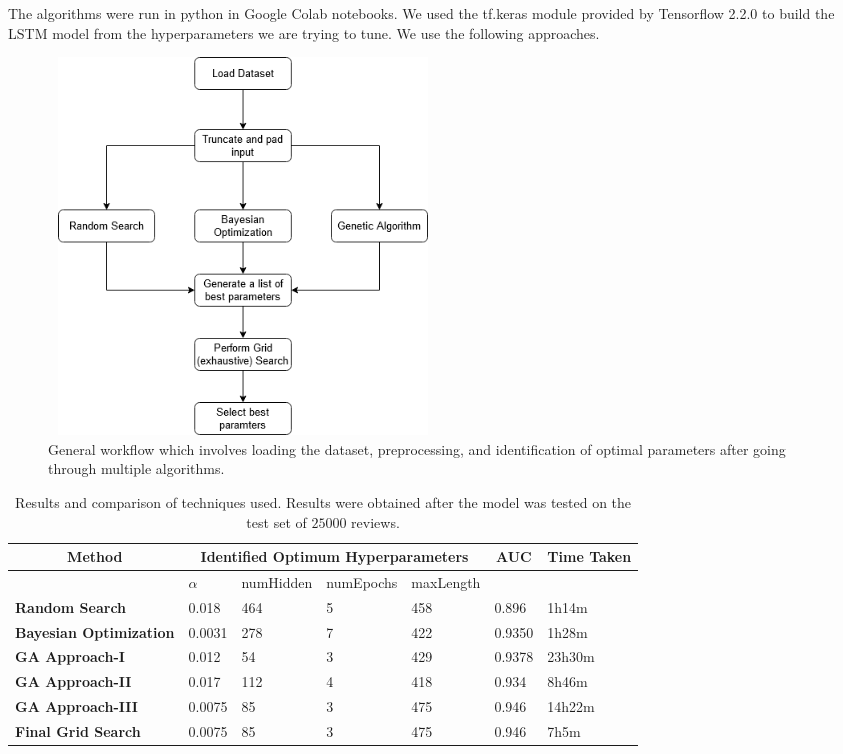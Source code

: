 \documentclass[conference]{IEEEtran}
\begin{document}
The algorithms were run in python in Google Colab notebooks. We used the tf.keras module provided by Tensorflow 2.2.0 to build the LSTM model from the hyperparameters we are trying to tune. We use the following approaches.

\begin{figure}
\includegraphics[width=0.5\textwidth, height=10cm, keepaspectratio]{flowchart.png}
\caption{ General workflow which involves loading the dataset, preprocessing, and identification of optimal parameters after going through multiple algorithms. }
 \label{fig:flowchart}
\end{figure}


\begin{table}[t]
\fontsize{9pt}{11pt}
\selectfont
\centering

\begin{tabular}{|p{4cm}|p{1cm}|p{1.5cm}|p{1.5cm}|p{1.5cm}|p{1cm}|p{1cm}|}
\hline
\multicolumn{1}{|c}{\textbf{Method}} & \multicolumn{4}{|c}{\textbf{Identified Optimum Hyperparameters}}& \multicolumn{1}{|c}{\textbf{AUC}}& \multicolumn{1}{|c|}{\textbf{Time Taken}}\\ 
\hline
\textbf & $\alpha$ & numHidden & numEpochs & maxLength &  & \\
\hline
\textbf{Random Search} & 0.018 & 464 & 5 & 458 & 0.896 & 1h14m\\
\hline
\textbf{Bayesian Optimization} & 0.0031 & 278 & 7 & 422 & 0.9350 & 1h28m\\ 
\hline
\textbf{GA Approach-I} & 0.012 & 54 & 3 & 429 & 0.9378 & 23h30m\\ 
\hline
\textbf{GA Approach-II} & 0.017 & 112 & 4 & 418 & 0.934 & 8h46m\\ 
\hline
\textbf{GA Approach-III} & 0.0075 & 85 & 3 & 475 & 0.946 & 14h22m\\ 
\hline
\textbf{Final Grid Search} & 0.0075 & 85 & 3 & 475 & 0.946 & 7h5m\\
\hline
\end{tabular}%
\label{tab:inference}
\caption{Results and comparison of techniques used. Results were obtained after the model was tested on the test set of $25000$ reviews.}
\label{tab:res}
\end{table}
\end{document}
